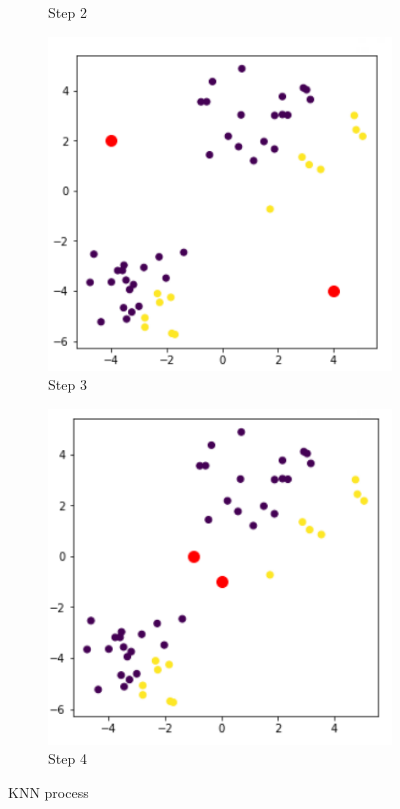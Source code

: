 \documentclass[11pt]{article}
\begin{document}
\begin{figure}[h]
\begin{subfigure}[b]{0.24\textwidth}
		\caption{Step 2}
	\end{subfigure}
	\begin{subfigure}[b]{0.24\textwidth}
		\centering
		\includegraphics[width=\linewidth]{../imgs/knn-proc-3.png}
		\caption{Step 3}
	\end{subfigure}
	\begin{subfigure}[b]{0.24\textwidth}
		\centering
		\includegraphics[width=\linewidth]{../imgs/knn-proc-4.png}
		\caption{Step 4}
	\end{subfigure}
	\caption{KNN process}
\end{figure}
\end{document}
